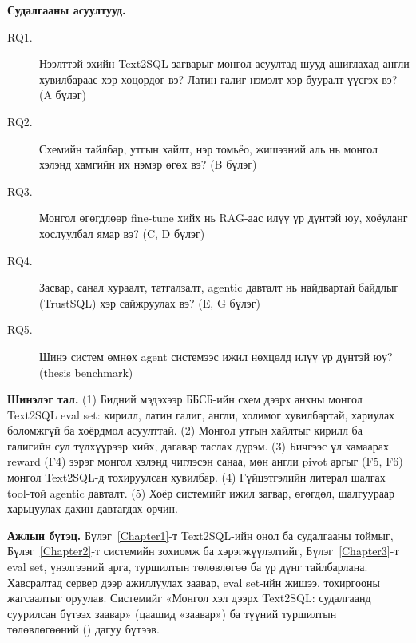 \textbf{Судалгааны асуултууд.}
\begin{description}
  \item[RQ1.] Нээлттэй эхийн Text2SQL загварыг монгол асуултад шууд ашиглахад англи хувилбараас хэр хоцордог вэ?
              Латин галиг нэмэлт хэр бууралт үүсгэх вэ? (A бүлэг)
  \item[RQ2.] Схемийн тайлбар, утгын хайлт, нэр томьёо, жишээний аль нь монгол хэлэнд хамгийн их нэмэр өгөх вэ? (B бүлэг)
  \item[RQ3.] Монгол өгөгдлөөр fine-tune хийх нь RAG-аас илүү үр дүнтэй юу, хоёуланг хослуулбал ямар вэ? (C, D бүлэг)
  \item[RQ4.] Засвар, санал хураалт, татгалзалт, agentic давталт нь найдвартай байдлыг (TrustSQL) хэр сайжруулах вэ? (E, G бүлэг)
  \item[RQ5.] Шинэ систем өмнөх agent системээс ижил нөхцөлд илүү үр дүнтэй юу? (thesis benchmark)
\end{description}

\textbf{Шинэлэг тал.} (1) Бидний мэдэхээр ББСБ-ийн схем дээрх анхны монгол Text2SQL eval set: кирилл, латин галиг, англи,
холимог хувилбартай, хариулах боломжгүй ба хоёрдмол асуулттай. (2) Монгол утгын хайлтыг кирилл ба галигийн сул
түлхүүрээр хийх, дагавар таслах дүрэм. (3) Бичгээс үл хамаарах reward (F4) зэрэг монгол хэлэнд чиглэсэн санаа, мөн
англи pivot аргыг (F5, F6) монгол Text2SQL-д тохируулсан хувилбар. (4) Гүйцэтгэлийн литерал шалгах tool-той agentic
давталт. (5) Хоёр системийг ижил загвар, өгөгдөл,
шалгуураар харьцуулах дахин давтагдах орчин.

\textbf{Ажлын бүтэц.} Бүлэг~\ref{Chapter1}-т Text2SQL-ийн онол ба судалгааны тоймыг, Бүлэг~\ref{Chapter2}-т системийн
зохиомж ба хэрэгжүүлэлтийг, Бүлэг~\ref{Chapter3}-т eval set, үнэлгээний арга, туршилтын төлөвлөгөө ба үр дүнг
тайлбарлана. Хавсралтад сервер дээр ажиллуулах заавар, eval set-ийн жишээ, тохиргооны жагсаалтыг оруулав. Системийг
«Монгол хэл дээрх Text2SQL: судалгаанд суурилсан бүтээх заавар» (цаашид «заавар») ба түүний туршилтын төлөвлөгөөний
() дагуу бүтээв.
